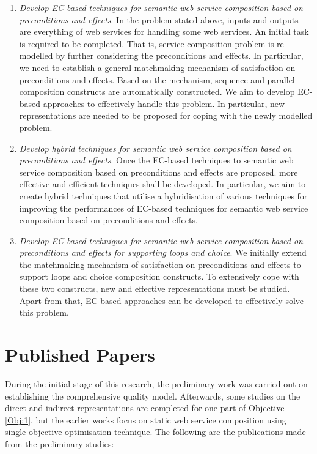 \begin{enumerate}
\begin{enumerate}
  \item \emph{Develop EC-based techniques for semantic web service composition based on preconditions and effects}. In the problem stated above, inputs and outputs are everything of web services for handling some web services. An initial task is required to be completed. That is, service composition problem is re-modelled by further considering the preconditions and effects. In particular, we need to establish a general matchmaking mechanism of satisfaction on preconditions and effects. Based on the mechanism, sequence and parallel composition constructs are automatically constructed. We aim to develop EC-based approaches to effectively handle this problem. In particular, new representations are needed to be proposed for coping with the newly modelled problem.

  \item \emph{Develop hybrid techniques for semantic web service composition based on preconditions and effects}. Once the EC-based techniques to semantic web service composition based on preconditions and effects are proposed. more effective and efficient techniques shall be developed. In particular, we aim to create hybrid techniques that utilise a hybridisation of various techniques for improving the performances of EC-based techniques for semantic web service composition based on preconditions and effects.
    
   \item \emph{Develop EC-based techniques for semantic web service composition based on preconditions and effects for supporting loops and choice}. We initially extend the matchmaking mechanism of satisfaction on preconditions and effects to support loops and choice composition constructs. To extensively cope with these two constructs, new and effective representations must be studied. Apart from that,  EC-based approaches can be developed to effectively solve this problem.

 
 \end{enumerate}
 
\end{enumerate}

\section{Published Papers}

During the initial stage of this research, the preliminary work was carried out on establishing the comprehensive quality model.  Afterwards, some studies on the direct and indirect representations are completed for one part of Objective \ref{Obj:1}, but the earlier works focus on static web service composition using single-objective optimisation technique. The following are the publications made from the preliminary studies:

